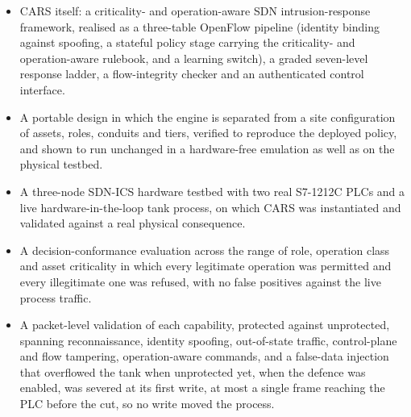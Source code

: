 \begin{itemize}
\item CARS itself: a criticality- and operation-aware SDN intrusion-response framework, realised as a three-table OpenFlow pipeline (identity binding against spoofing, a stateful policy stage carrying the criticality- and operation-aware rulebook, and a learning switch), a graded seven-level response ladder, a flow-integrity checker and an authenticated control interface.
\item A portable design in which the engine is separated from a site configuration of assets, roles, conduits and tiers, verified to reproduce the deployed policy, and shown to run unchanged in a hardware-free emulation as well as on the physical testbed.
\item A three-node SDN-ICS hardware testbed with two real S7-1212C PLCs and a live hardware-in-the-loop tank process, on which CARS was instantiated and validated against a real physical consequence.
\item A decision-conformance evaluation across the range of role, operation class and asset criticality in which every legitimate operation was permitted and every illegitimate one was refused, with no false positives against the live process traffic.
\item A packet-level validation of each capability, protected against unprotected, spanning reconnaissance, identity spoofing, out-of-state traffic, control-plane and flow tampering, operation-aware commands, and a false-data injection that overflowed the tank when unprotected yet, when the defence was enabled, was severed at its first write, at most a single frame reaching the PLC before the cut, so no write moved the process.
\end{itemize}
